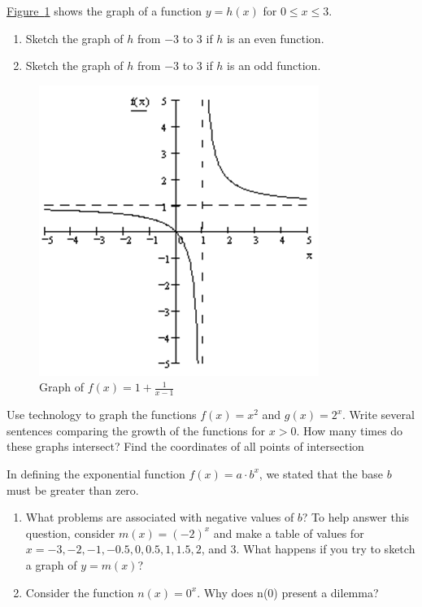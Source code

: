 \documentclass[10pt,]{book}
\theoremstyle{ptxdefinitionnotitle}
\theoremstyle{ptxdefinitiontitle}
\numberwithin{equation}{section}
\newcommand{\gt}{>}
\begin{document}
\begin{divisionexercise}{12}\hypertarget{exercise-22}{}
\hypertarget{p-74}{}%
\hyperref[chapter02-section02-exercise12-figure]{Figure~\ref{chapter02-section02-exercise12-figure}} shows the graph of a function \(y = h(x)\) for \(0 \leq x \leq 3\). \leavevmode%
\begin{enumerate}[label=(\alph*)]
\item\hypertarget{li-62}{}Sketch the graph of \(h\) from \(-3\) to \(3\) if \(h\) is an even function.%
\item\hypertarget{li-63}{}Sketch the graph of \(h\) from \(-3\) to \(3\) if \(h\) is an odd function.%
\end{enumerate}
%
\begin{figure}
\centering
\includegraphics[width=0.5\linewidth]{./src/images/chapter02/chapter02section02-exercise11.png}
\caption{Graph of \(f(x) = 1 + \frac{1}{x-1}\)\label{chapter02-section02-exercise12-figure}}
\end{figure}
\end{divisionexercise}%
\begin{divisionexercise}{13}\hypertarget{exercise-23}{}
\hypertarget{p-75}{}%
Use technology to graph the functions \(f(x) = x^2\) and \(g(x) = 2^x\). Write several sentences comparing the growth of the functions for \(x \gt 0\). How many times do these graphs intersect?  Find the coordinates of all points of intersection%
\end{divisionexercise}%
\begin{divisionexercise}{14}\hypertarget{exercise-24}{}
\hypertarget{p-76}{}%
In defining the exponential function \(f(x) = a \cdot b^x\), we stated that the base \(b\) must be greater than zero. \leavevmode%
\begin{enumerate}[label=(\alph*)]
\item\hypertarget{li-64}{}What problems are associated with negative values of \(b\)?  To help answer this question, consider \(m(x) = \left( -2 \right)^x\) and make a table of values for \(x = -3, -2, -1, -0.5, 0, 0.5, 1, 1.5, 2\), and \(3\). What happens if you try to sketch a graph of \(y = m(x)\)?%
\item\hypertarget{li-65}{}Consider the function \(n(x) = 0^x\). Why does n(0) present a dilemma?%
\end{enumerate}
%
\end{divisionexercise}%
\end{document}
